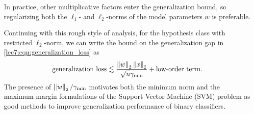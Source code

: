     In practice, other multiplicative factors enter the generalization bound, so regularizing both the $\ell_1$- and $\ell_2$-norms of the model parameters $w$ is preferable.

    Continuing with this rough style of analysis, for the hypothesis class with restricted $\ell_2$-norm, we can write the bound on the generalization gap in \eqref{lec7:eqn:generalization_loss} as
    \begin{equation}
        \text{generalization loss} \lesssim \frac{\left\|w\right\|_2\left\|x\right\|_2}{\sqrt{n}\gamma_{\mathrm{min}}} + \text{low-order term}.
    \end{equation}
    The presence of $\left\|w\right\|_2/\gamma_{\mathrm{min}}$ motivates both the minimum norm and the maximum margin formulations of the Support Vector Machine (SVM) problem as good methods to improve generalization performance of binary classifiers.

